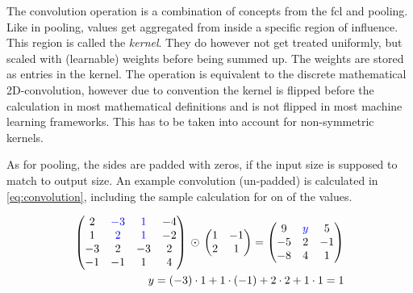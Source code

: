 The convolution operation is a combination of concepts from the fcl and pooling.
Like in pooling, values get aggregated from inside a specific region of influence.
This region is called the \emph{kernel}.
They do however not get treated uniformly, but scaled with (learnable) weights before being summed up.
The weights are stored as entries in the kernel. 
The operation is equivalent to the discrete mathematical 2D-convolution, however due to convention the kernel is flipped before the calculation in most mathematical definitions \cite{multidimConv} and is not flipped in most machine learning frameworks.
This has to be taken into account for non-symmetric kernels.

As for pooling, the sides are padded with zeros, if the input size is supposed to match to output size. 
An example convolution (un-padded) is calculated in \autoref{eq:convolution}, including the sample calculation for on of the values.

\begin{equation}
    \label{eq:convolution}
    \begin{split}
        \left(\begin{matrix}
            2 & \textcolor{blue}{-3} & \textcolor{blue}{1} & -4 \\
            1 & \textcolor{blue}{2} & \textcolor{blue}{1} & -2 \\
            -3 & 2 & -3 & 2 \\
            -1 & -1 & 1 & 4 \\
        \end{matrix}\right)\,\odot\,
        \left(\begin{matrix}
            1 & -1  \\
            2 & 1   \\
        \end{matrix}\right) = 
        \left(\begin{matrix}
            9 & \textcolor{blue}{y} & 5 \\
            -5 & 2 & -1 \\
            -8 & 4 & 1 \\
        \end{matrix}\right)\\
        y = (-3)\cdot 1 + 1 \cdot (-1) + 2 \cdot 2 + 1 \cdot 1 = 1
    \end{split}
\end{equation}

